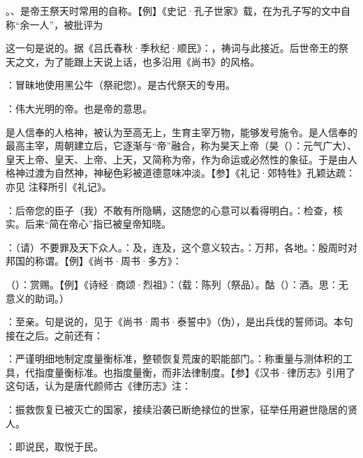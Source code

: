 {\begin{lyitemize}
\item {}。、是帝王祭天时常用的自称。【例】《史记·孔子世家》载，在为孔子写的文中自称“余一人”，被批评为

这一句是说的。据《吕氏春秋·季秋纪·顺民》：，祷词与此接近。后世帝王的祭天之文，为了能跟上天说上话，也多沿用《尚书》的风格。

\item {}：冒昧地使用黑公牛（祭祀您）。是古代祭天的专用。
\item {}：伟大光明的帝。也是帝的意思。

是人信奉的人格神，被认为至高无上，生育主宰万物，能够发号施令。是人信奉的最高主宰，周朝建立后，它逐渐与“帝”融合，称为昊天上帝（昊（）：元气广大）、皇天上帝、皇天、上帝、上天，又简称为帝，作为命运或必然性的象征。于是由人格神过渡为自然神，神秘色彩被道德意味冲淡。【参】《礼记·郊特牲》孔颖达疏：亦见  注释所引《礼记》。

\item {}：后帝您的臣子（我）不敢有所隐瞒，这随您的心意可以看得明白。：检查，核实。后来“简在帝心”指已被皇帝知晓。
\item {}：（请）不要罪及天下众人。：及，连及，这个意义较古。：万邦，各地。：殷周时对邦国的称谓。【例】《尚书·周书·多方》：
\item {}（）：赏赐。【例】《诗经·商颂·烈祖》：（载：陈列（祭品）。酤（）：酒。思：无意义的助词。）
\item {}：至亲。句是说的，见于《尚书·周书·泰誓中》（伪），是出兵伐的誓师词。本句接在之后。之前还有：

\item {}：严谨明细地制定度量衡标准，整顿恢复荒废的职能部门。：称重量与测体积的工具，代指度量衡标准。也指度量衡，而非法律制度。【参】《汉书·律历志》引用了这句话，认为是唐代颜师古《律历志》注：

\item {}：振救恢复已被灭亡的国家，接续沿袭已断绝禄位的世家，征举任用避世隐居的贤人。%
\item {}：即说民，取悦于民。
\end{lyitemize}
}
{}


